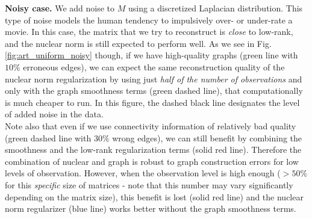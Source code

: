 \documentclass{article}
\begin{document}
{\bf Noisy case. } We add noise to $M$ using a discretized Laplacian distribution. This type of noise models the human tendency to impulsively over- or under-rate a movie. In this case, the matrix that we try to reconstruct is \textit{close} to low-rank, and the nuclear norm is still expected to perform well. As we see in Fig. \ref{fig:art_uniform_noisy} though, if we have high-quality graphs (green line with $10\%$ erroneous edges), we can expect the same reconstruction quality of the nuclear norm regularization by using just \textit{half of the number of observations} and only with the graph smoothness terms (green dashed line), that computationally is much cheaper to run. In this figure, the dashed black line designates the level of added noise in the data.\\
Note also that even if we use connectivity information of relatively bad quality (green dashed line with $30\%$ wrong edges), we can still benefit by combining the smoothness and the low-rank regularization terms (solid red line). Therefore the combination of nuclear and graph is robust to graph construction errors for low levels of observation. However, when the observation level is high enough ($>50\%$ for this \textit{specific} size of matrices - note that this number may vary significantly depending on the matrix size), this benefit is lost (solid red line) and the nuclear norm regularizer (blue line) works better without the graph smoothness terms.
\end{document}
